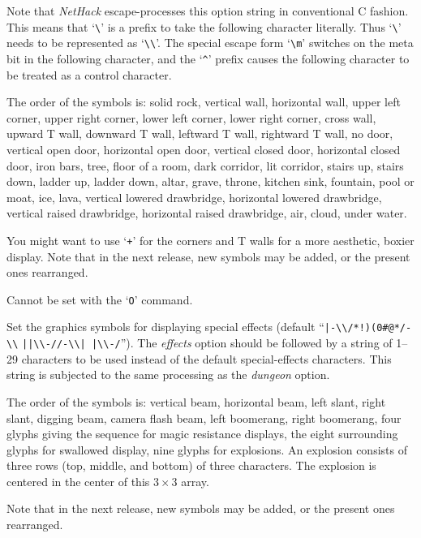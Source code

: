 Note that {\it NetHack\/} escape-processes this option string in conventional C
fashion.  This means that `\verb+\+' is a prefix to take the following
character literally.  Thus `\verb+\+' needs to be represented as `\verb+\\+'.
The special escape form
`\verb+\m+' switches on the meta bit in the following character, and the
`{\tt \^{}}' prefix causes the following character to be treated as a control
character.

The order of the symbols is:  solid rock, vertical wall, horizontal
wall, upper left corner, upper right corner, lower left corner, lower
right corner, cross wall, upward T wall, downward T wall, leftward T
wall, rightward T wall, no door, vertical open door, horizontal open
door, vertical closed door, horizontal closed door, iron bars, tree,
floor of a room, dark corridor, lit corridor, stairs up, stairs down,
ladder up, ladder down, altar, grave, throne, kitchen sink, fountain, pool or moat,
ice, lava, vertical lowered drawbridge, horizontal lowered drawbridge,
vertical raised drawbridge, horizontal raised drawbridge, air, cloud,
under water.

You might want to use `{\tt +}' for the corners and T walls for a more
aesthetic, boxier display.  Note that in the next release, new symbols
may be added, or the present ones rearranged.

Cannot be set with the `{\tt O}' command.
\item[\ib{effects}]
Set the graphics symbols for displaying special effects (default
``\verb&|-\\/*!)(0#@*/-\\& \verb&||\\-//-\\| |\\-/&'').
The {\it effects\/} option should be
followed by a string of 1--29
characters to be used instead of the default special-effects characters.
This string is subjected to the same processing as the {\it dungeon\/} option.

The order of the symbols is:  vertical beam, horizontal beam, left slant,
right slant, digging beam, camera flash beam, left boomerang, right boomerang,
four glyphs giving the sequence for magic resistance displays,
the eight surrounding glyphs for swallowed display,
nine glyphs for explosions.
An explosion consists of three rows (top, middle, and bottom) of three
characters.  The explosion is centered in the center of this $3 \times 3$
array.

Note that in the next release, new symbols may be added,
or the present ones rearranged.

